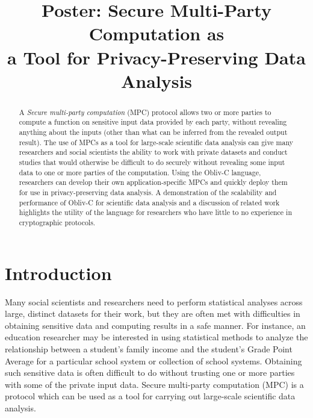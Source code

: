 \documentclass[conference]{IEEEtran}
\begin{document}
\title{Poster: Secure Multi-Party Computation as\\ a Tool for Privacy-Preserving Data Analysis}

\author{
}
\maketitle


\begin{abstract}
A \emph{Secure multi-party computation} (MPC) protocol allows two or more parties to compute a function on sensitive input data provided by each party, without revealing anything about the inputs (other than what can be inferred from the revealed output result). 
The use of MPCs as a tool for large-scale scientific data analysis can give many
researchers and social scientists the ability to work with private datasets and conduct
studies that would otherwise be difficult to do securely without revealing some
input data to one or more parties of the computation.
Using the Obliv-C language, researchers can develop their own application-specific
MPCs and quickly deploy them for use in privacy-preserving data analysis.
A demonstration of the scalability and performance of Obliv-C for scientific data analysis
and a discussion of related work highlights the utility of the language for 
researchers who have little to no experience in cryptographic protocols. 
\end{abstract}

\section{Introduction}
Many social scientists and researchers need to perform statistical analyses across 
large, distinct datasets for their work, but they are often met with difficulties in
obtaining sensitive data and computing results in a safe manner.
For instance, an education researcher may be interested in using statistical methods 
to analyze the relationship between a student's family income and the student's 
Grade Point Average for a particular school system or collection of school systems. 
Obtaining such sensitive data is often difficult to do without trusting 
one or more parties with some of the private input data.
Secure multi-party computation (MPC) is a protocol which can be used as a tool 
for carrying out large-scale scientific data analysis.
\end{document}
